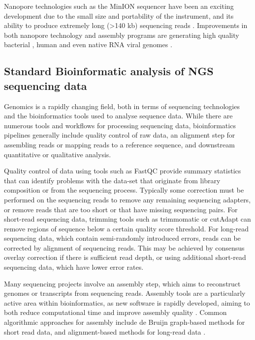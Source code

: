 Nanopore technologies such as the MinION sequencer have been an exciting development due to the small size and portability of the instrument, and its ability to produce extremely long (>140 kb) sequencing reads \citep{Jain2016-hk}. Improvements in both nanopore technology and assembly programs are generating high quality bacterial \citep{Quick2014-qr}, human \citep{Jain2018-xk} and even native RNA viral genomes \citep{Keller2018-sb}.\par

\subsection{Standard Bioinformatic analysis of NGS sequencing data}
Genomics is a rapidly changing field, both in terms of sequencing technologies and the bioinformatics tools used to analyse sequence data. While there are numerous tools and  workflows for processing sequencing data, bioinformatics pipelines generally include quality control of raw data, an alignment step for assembling reads or mapping reads to a reference sequence, and downstream quantitative or qualitative analysis.\par
Quality control of data using tools such as FastQC \citep{Andrews_2010} provide summary statistics that can identify problems with the data-set that originate from library composition or from the sequencing process. Typically some correction must be performed on the sequencing reads to remove any remaining sequencing adapters, or remove reads that are too short or that have missing sequencing pairs. For short-read sequencing data, trimming tools such as trimmomatic \citep{Bolger_Lohse_Usadel_2014} or cutAdapt \citep{Martin_2011} can remove regions of sequence below a certain quality score threshold. For long-read sequencing data, which contain semi-randomly introduced errors, reads can be corrected by alignment of sequencing reads. This may be achieved by consensus overlay correction if there is sufficient read depth, or using additional short-read sequencing data, which have lower error rates.\par
Many sequencing projects involve an assembly step, which aims to reconstruct genomes or transcripts from sequencing reads. Assembly tools are a particularly active area within bioinformatics, as new software is rapidly developed, aiming to both reduce computational time and improve assembly quality \citep{Sohn_Nam_2018,Simpson_Pop_2015}. Common algorithmic approaches for assembly include de Bruijn graph-based methods for short read data, and alignment-based methods for long-read data \citep{Simpson_Pop_2015}.\par
